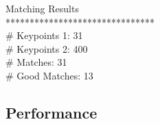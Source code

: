 Matching Results\\
*******************************\\
\# Keypoints 1:                           31\\
\# Keypoints 2:                           400\\
\# Matches:                               31\\
\# Good Matches:                          13\\

\subsection{Performance}





